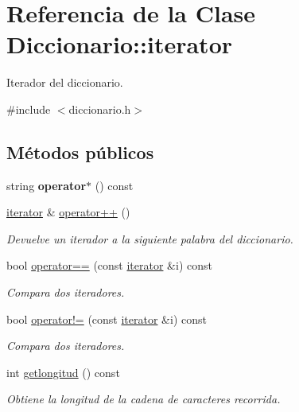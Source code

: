 \hypertarget{class_diccionario_1_1iterator}{}\section{Referencia de la Clase Diccionario\+:\+:iterator}
\label{class_diccionario_1_1iterator}


Iterador del diccionario.  




{\ttfamily \#include $<$diccionario.\+h$>$}

\subsection*{Métodos públicos}
\begin{DoxyCompactItemize}
\item 
string {\bfseries operator$\ast$} () const \hypertarget{class_diccionario_1_1iterator_a49122caeb87117cefbaa3178bb72b9ed}{}\label{class_diccionario_1_1iterator_a49122caeb87117cefbaa3178bb72b9ed}

\item 
\hyperlink{class_diccionario_1_1iterator}{iterator} \& \hyperlink{class_diccionario_1_1iterator_ae3f020050c891ff3a94e599879401729}{operator++} ()\hypertarget{class_diccionario_1_1iterator_ae3f020050c891ff3a94e599879401729}{}\label{class_diccionario_1_1iterator_ae3f020050c891ff3a94e599879401729}

\begin{DoxyCompactList}\small\item\em Devuelve un iterador a la siguiente palabra del diccionario. \end{DoxyCompactList}\item 
bool \hyperlink{class_diccionario_1_1iterator_a506fb6cbb31ee064a7f9015a71a4a0f1}{operator==} (const \hyperlink{class_diccionario_1_1iterator}{iterator} \&i) const 
\begin{DoxyCompactList}\small\item\em Compara dos iteradores. \end{DoxyCompactList}\item 
bool \hyperlink{class_diccionario_1_1iterator_a28012e50868bb69bd7c6299744fbc1e8}{operator!=} (const \hyperlink{class_diccionario_1_1iterator}{iterator} \&i) const 
\begin{DoxyCompactList}\small\item\em Compara dos iteradores. \end{DoxyCompactList}\item 
int \hyperlink{class_diccionario_1_1iterator_a763740886a690d8346c58297c85a75dd}{getlongitud} () const 
\begin{DoxyCompactList}\small\item\em Obtiene la longitud de la cadena de caracteres recorrida. \end{DoxyCompactList}\end{DoxyCompactItemize}
